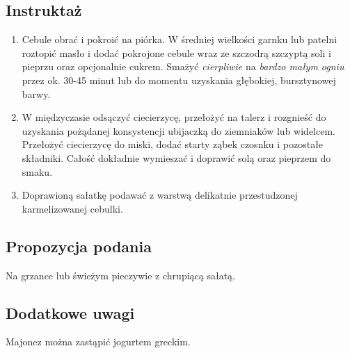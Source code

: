 \subsection*{Instruktaż}
\begin{enumerate}
    \item Cebule obrać i pokroić na piórka. W średniej wielkości garnku lub patelni roztopić masło i dodać pokrojone cebule wraz ze szczodrą szczyptą soli i pieprzu oraz opcjonalnie cukrem. Smażyć \textit{cierpliwie} na \textit{bardzo małym ogniu} przez ok. 30-45 minut lub do momentu uzyskania głębokiej, bursztynowej barwy.
    \item W międzyczasie odsączyć ciecierzycę, przełożyć na talerz i rozgnieść do uzyskania pożądanej konsystencji ubijaczką do ziemniaków lub widelcem. Przełożyć ciecierzycę do miski, dodać starty ząbek czosnku i pozostałe składniki. Całość dokładnie wymieszać i doprawić solą oraz pieprzem do smaku.
    \item Doprawioną sałatkę podawać z warstwą delikatnie przestudzonej karmelizowanej cebulki.
\end{enumerate}

\vspace{0.5cm}

\small \subsection*{Propozycja podania} Na grzance lub świeżym pieczywie z chrupiącą sałatą.

\vspace{0.3cm}

\subsection*{Dodatkowe uwagi} Majonez można zastąpić jogurtem greckim.

\newpage
